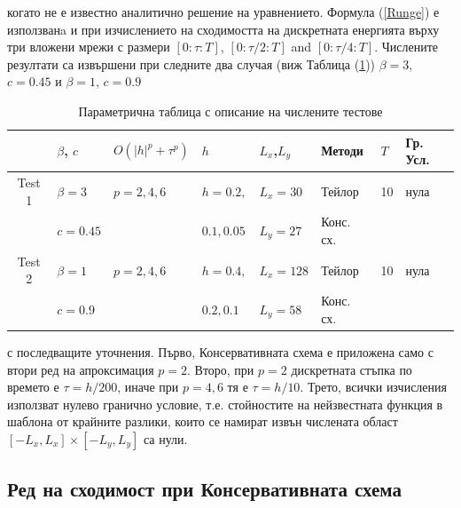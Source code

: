 \documentclass{article}
\newcommand{\rf}[1]{(\ref{#1})}
\begin{document}
когато не е известно аналитично решение на уравнението. Формула \rf{Runge} е използванa и при изчислението на сходимостта на дискретната енергията върху три вложени мрежи с размери $[0:\tau:T]$, $[0:\tau/2:T]$ and $[0:\tau/4:T]$. Числените резултати са извършени при следните два случая (виж Таблица \rf{tableP}) $\beta = 3$, $c=0.45$ и $\beta = 1$, $c=0.9$ \begin{table}
\centering
\small
		\begin{tabular}{||c|l|l|l|l|l|l|l||}
			\hline
			\hline
                                            &    $\beta$, $c$                              & $O(|h|^p+\tau^p)$   &      $h$                                & $L_x$,$L_y$                              &  Методи & $T$      & Гр. Усл.  \\
   			\hline 
					\hline
           Test 1                        &      $\beta = 3$     &      $p=2, 4, 6$    &    $h=0.2,$       & $L_x = 30$                & Тейлор &                10    &    нула  \\
                                             &      $c=0.45$         &                             &    $ 0.1, 0.05$   & $L_y=27$                  &  Конс. сх. &                &            \\
	   \hline
			\hline 
           Test 2                        &      $\beta = 1$     &      $p=2, 4, 6$    &     $h=0.4,$       & $L_x = 128$         & Тейлор  &               10    &   нула  \\
                                             &      $c=0.9$           &                             &      $0.2, 0.1$     & $L_y=58$              & Конс. сх.  &                   &     \\
	   \hline
			\hline 
		\end{tabular}
\caption{Параметрична таблица с описание на числените тестове}
\label{tableP}
\end{table}
с последващите уточнения. Първо, Консервативната схема е приложена само с втори ред на апроксимация  $p=2$. Второ, при $p=2$ дискретната стъпка по времето е 
 $\tau=h/200$, иначе при $p=4, 6$ тя е $\tau = h/10$. Трето, всички изчисления използват нулево гранично условие, т.е. стойностите на нейзвестната функция в шаблона от крайните разлики, които се намират извън числената област $[-L_x, L_x] \times [-L_y, L_y]$ са нули.

\subsection{Ред на сходимост при Консервативната схема}
\end{document}
